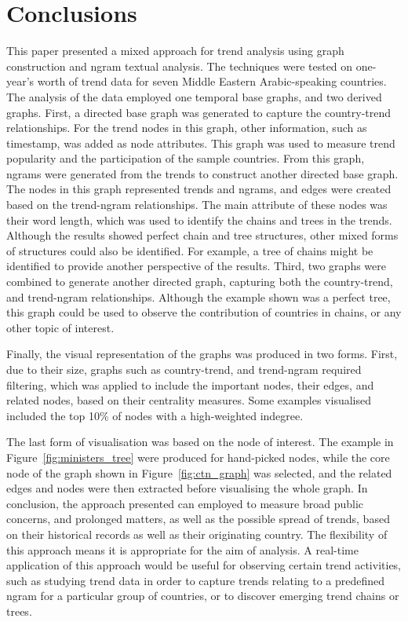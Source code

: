 \documentclass[utf8]{frontiersSCNS} %
\begin{document}
{\section{Conclusions}\label{conclusions}

This paper presented a mixed approach for trend analysis using graph construction and ngram textual analysis. The techniques were tested on one-year’s worth of trend data for seven Middle Eastern Arabic-speaking countries. The analysis of the data employed one temporal base graphs, and two derived graphs.  First, a directed base graph was generated to capture the country-trend relationships. For the trend nodes in this graph, other information, such as timestamp, was added as node attributes. This graph was used to measure trend popularity and the participation of the sample countries. From this graph, ngrams were generated from the trends to construct another directed base graph. The nodes in this graph represented trends and ngrams, and edges were created based on the trend-ngram relationships. The main attribute of these nodes was their word length, which was used to identify the chains and trees in the trends. Although the results showed perfect chain and tree structures, other mixed forms of structures could also be identified. For example, a tree of chains might be identified to provide another perspective of the results. Third, two graphs were combined to generate another directed graph, capturing both the country-trend, and trend-ngram relationships. Although the example shown was a perfect tree, this graph could be used to observe the contribution of countries in chains, or any other topic of interest. 

Finally, the visual representation of the graphs was produced in two forms. First, due to their size, graphs such as country-trend, and trend-ngram required filtering, which was applied to include the important nodes, their edges, and related nodes, based on their centrality measures. Some examples visualised included the top 10\% of nodes with a high-weighted indegree. 

The last form of visualisation was based on the node of interest. The example in Figure~\ref{fig:ministers_tree} were produced for hand-picked nodes, while the core node of the graph shown in Figure~\ref{fig:ctn_graph} was selected, and the related edges and nodes were then extracted before visualising the whole graph.  In conclusion, the approach presented can employed to measure broad public concerns, and prolonged matters, as well as the possible spread of trends, based on their historical records as well as their originating country. The flexibility of this approach means it is appropriate for the aim of analysis.  A real-time application of this approach would be useful for observing certain trend activities, such as studying trend data in order to capture trends relating to a predefined ngram for a particular group of countries, or to discover emerging trend chains or trees.


}
\end{document}
